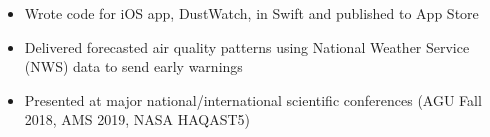 {
	\begin{itemize}
		\item Wrote code for iOS app, DustWatch, in Swift and published to App Store
		\item Delivered forecasted air quality patterns using National Weather Service (NWS) data to send early warnings
		\item Presented at major national/international scientific conferences (AGU Fall 2018, AMS 2019, NASA HAQAST5)
	\end{itemize}
}
